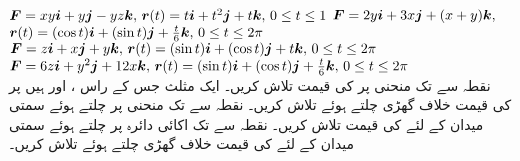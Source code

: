 \(\kvec{F}=xy\ai+y\aj-yz\ak,\, \kvec{r}(t)=t\ai+t^2\aj+t\ak,\, 0\le t\le 1\)
\(\kvec{F}=2y\ai+3x\aj+(x+y)\ak,\)\\
\( \kvec{r}(t)=(\cos t)\ai+(\sin t)\aj+\tfrac{t}{6}\ak,\, 0\le t\le 2\pi\)
\(\kvec{F}=z\ai+x\aj+y\ak,\, \kvec{r}(t)=(\sin t)\ai+(\cos t)\aj+t\ak,\, 0\le t\le 2\pi\)
\(\kvec{F}=6z\ai+y^2\aj+12x\ak,\, \kvec{r}(t)=(\sin t)\ai+(\cos t)\aj+\tfrac{t}{6}\ak,\, 0\le t\le 2\pi\)
\\
نقطہ  سے  تک منحنی  پر  کی قیمت تلاش کریں۔
ایک مثلث جس کے راس ،  اور  ہیں پر   کی قیمت خلاف گھڑی چلتے ہوئے  تلاش کریں۔
نقطہ  سے  تک منحنی  پر چلتے ہوئے سمتی میدان  کے لئے  کی قیمت تلاش کریں۔ 
نقطہ  سے  تک اکائی دائرہ  پر چلتے ہوئے سمتی میدان  کے لئے  کی قیمت خلاف گھڑی چلتے ہوئے تلاش کریں۔ 
